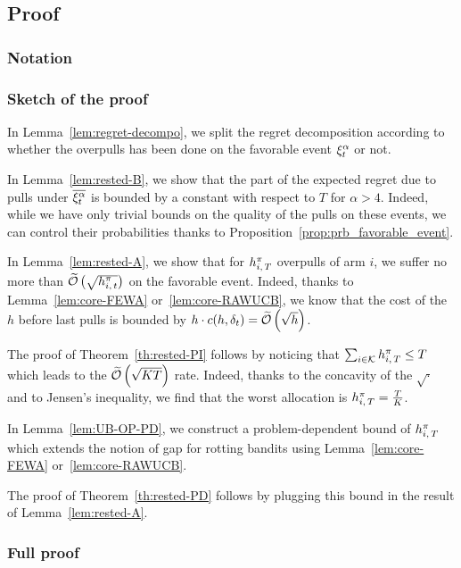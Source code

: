\subsection{Proof}
\subsubsection*{Notation}
\subsubsection*{Sketch of the proof}
In Lemma~\ref{lem:regret-decompo}, we split the regret decomposition according to whether the overpulls has been done on the favorable event $\xi^\alpha_t$ or not. 

In Lemma~\ref{lem:rested-B}, we show that the part of the expected regret due to pulls under $\overline{\xi^\alpha_t}$ is bounded by a constant with respect to $T$ for $\alpha > 4$. Indeed, while we have only trivial bounds on the quality of the pulls on these events, we can control their probabilities thanks to Proposition~\ref{prop:prb_favorable_event}.

In Lemma~\ref{lem:rested-A}, we show that for $h_{i,\,T}^\pi$ overpulls of arm $i$, we suffer no more than $\widetilde{\mathcal{O}}\left(\sqrt{h_{i,\,t}^\pi}\right)$ on the favorable event. Indeed, thanks to Lemma~\ref{lem:core-FEWA} or~\ref{lem:core-RAWUCB}, we know that the cost of the $h$ before last pulls is bounded by $h \cdot c(h, \delta_t) = \widetilde{\mathcal{O}}\left(\sqrt{h}\right)$.

The proof of Theorem~\ref{th:rested-PI} follows by noticing that $\sum_{i \in \mathcal{K}} h_{i,\,T}^\pi \leq T$ which leads to the $\widetilde{\mathcal{O}}\left(\sqrt{KT}\right)$ rate. Indeed, thanks to the concavity of the $\sqrt{\cdot}$ and to Jensen's inequality, we find that the worst allocation is $h_{i,\,T}^\pi = \frac{T}{K}$.

In Lemma~\ref{lem:UB-OP-PD}, we construct a problem-dependent bound of $h_{i,\,T}^\pi$ which extends the notion of gap for rotting bandits using Lemma~\ref{lem:core-FEWA} or~\ref{lem:core-RAWUCB}.

The proof of Theorem~\ref{th:rested-PD} follows by plugging this bound in the result of Lemma~\ref{lem:rested-A}.

\subsubsection*{Full proof}
\label{ss:rested-proof}

